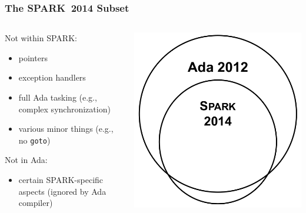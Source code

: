 \begin{frame}
  \frametitle{The SPARK~2014 Subset}
  \begin{columns}
    \begin{column}[T]{0.5\textwidth}
      Not within SPARK:
      \begin{itemize}
      \item pointers
      \item exception handlers
      \item full Ada tasking (e.g., complex synchronization)
      \item various minor things (e.g., no \texttt{goto})
     \end{itemize}
     Not in Ada:
     \begin{itemize}
     \item certain SPARK-specific aspects (ignored by Ada compiler)
     \end{itemize}
    \end{column}
    \begin{column}[T]{0.5\textwidth}
      \includegraphics[width=\textwidth]{content/images/spark/subset}
    \end{column}
  \end{columns}
\end{frame}

